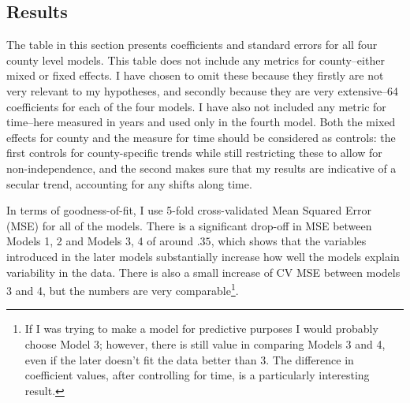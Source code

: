 \documentclass[12pt,twoside]{reedthesis}
\begin{document}
  \subsection{Results}\label{results}
  
  The table in this section presents coefficients and standard errors for
  all four county level models. This table does not include any metrics
  for county--either mixed or fixed effects. I have chosen to omit these
  because they firstly are not very relevant to my hypotheses, and
  secondly because they are very extensive--64 coefficients for each of
  the four models. I have also not included any metric for time--here
  measured in years and used only in the fourth model. Both the mixed
  effects for county and the measure for time should be considered as
  controls: the first controls for county-specific trends while still
  restricting these to allow for non-independence, and the second makes
  sure that my results are indicative of a secular trend, accounting for
  any shifts along time.
  
  In terms of goodness-of-fit, I use 5-fold cross-validated Mean Squared
  Error (MSE) for all of the models. There is a significant drop-off in
  MSE between Models 1, 2 and Models 3, 4 of around \(.35\), which shows
  that the variables introduced in the later models substantially increase
  how well the models explain variability in the data. There is also a
  small increase of CV MSE between models 3 and 4, but the numbers are
  very comparable\footnote{If I was trying to make a model for predictive
    purposes I would probably choose Model 3; however, there is still
    value in comparing Models 3 and 4, even if the later doesn't fit the
    data better than 3. The difference in coefficient values, after
    controlling for time, is a particularly interesting result.}.
  
\end{document}
